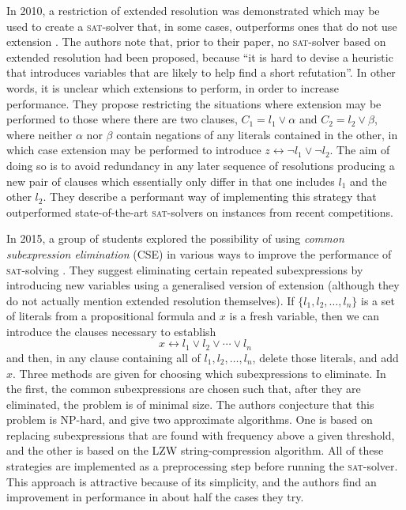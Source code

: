 \documentclass[proof,pdftex,11pt,a4,titlepage]{article}
\newcommand{\sat}{\textsc{sat}}
\begin{document}
In 2010, a restriction of extended resolution was demonstrated which may be used to create a \sat{}-solver that, in some cases, outperforms ones that do not use extension \cite{Audemard:2010}. The authors note that, prior to their paper, no \sat{}-solver based on extended resolution had been proposed, because ``it is hard to devise a heuristic that introduces variables that are likely to help find a short refutation''. In other words, it is unclear which extensions to perform, in order to increase performance. They propose restricting the situations where extension may be performed to those where there are two clauses, $C_1 = l_1 \vee \alpha$ and $C_2 = l_2 \vee \beta$, where neither $\alpha$ nor $\beta$ contain negations of any literals contained in the other, in which case extension may be performed to introduce $z \leftrightarrow \neg l_1 \vee \neg l_2$. The aim of doing so is to avoid redundancy in any later sequence of resolutions producing a new pair of clauses which essentially only differ in that one includes $l_1$ and the other $l_2$. They describe a performant way of implementing this strategy that outperformed state-of-the-art \sat{}-solvers on instances from recent competitions.

In 2015, a group of students explored the possibility of using \emph{common subexpression elimination} (CSE) in various ways to improve the performance of \sat{}-solving \cite{Yan:2015}. They suggest eliminating certain repeated subexpressions by introducing new variables using a generalised version of extension (although they do not actually mention extended resolution themselves). If $\{l_1, l_2, \ldots, l_n\}$ is a set of literals from a propositional formula and $x$ is a fresh variable, then we can introduce the clauses necessary to establish
\[x \leftrightarrow l_1 \vee l_2 \vee \cdots \vee l_n\]
and then, in any clause containing all of $l_1, l_2, \ldots, l_n$, delete those literals, and add $x$. Three methods are given for choosing which subexpressions to eliminate. In the first, the common subexpressions are chosen such that, after they are eliminated, the problem is of minimal size. The authors conjecture that this problem is NP-hard, and give two approximate algorithms. One is based on replacing subexpressions that are found with frequency above a given threshold, and the other is based on the LZW string-compression algorithm. All of these strategies are implemented as a preprocessing step before running the \sat{}-solver. This approach is attractive because of its simplicity, and the authors find an improvement in performance in about half the cases they try.
\end{document}
